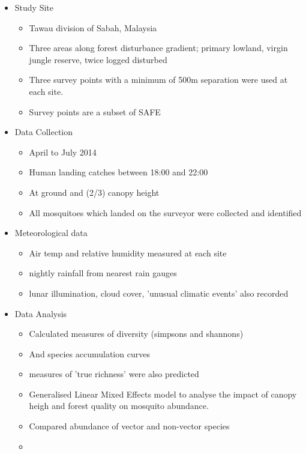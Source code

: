 \begin{itemize}
	\item Study Site
	\begin{itemize}
		\item Tawau division of Sabah, Malaysia
		\item Three areas along forest disturbance gradient; primary lowland, virgin jungle reserve, twice logged disturbed
		\item Three survey points with a minimum of 500m separation were used at each site.
		\item Survey points are a subset of SAFE 
	\end{itemize}

	\item Data Collection
	\begin{itemize}
		\item April to July 2014
		\item Human landing catches between 18:00 and 22:00
		\item At ground and (2/3) canopy height
		\item All mosquitoes which landed on the surveyor were collected and identified
	\end{itemize}

	\item Meteorological data
	\begin{itemize}
		\item Air temp and relative humidity measured at each site
		\item nightly rainfall from nearest rain gauges
		\item lunar illumination, cloud cover, 'unusual climatic events' also recorded
	\end{itemize}

	\item Data Analysis
	\begin{itemize}
		\item Calculated measures of diversity (simpsons and shannons)
		\item And species accumulation curves
		\item measures of 'true richness' were also predicted
		\item Generalised Linear Mixed Effects model to analyse the impact of canopy heigh and forest quality on mosquito abundance.
		\item Compared abundance of vector and non-vector species
		\item 
	\end{itemize}

\end{itemize}

